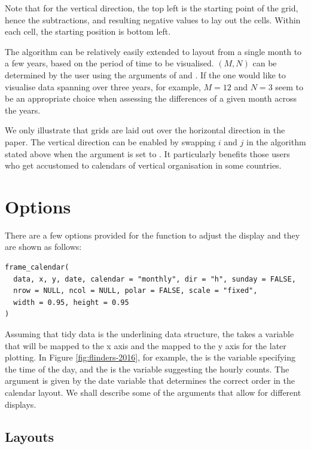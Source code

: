 \documentclass[article]{jss}
\begin{document}
Note that for the vertical direction, the top left is the starting point
of the grid, hence the subtractions, and resulting negative values to
lay out the cells. Within each cell, the starting position is bottom
left.

The algorithm can be relatively easily extended to layout from a single
month to a few years, based on the period of time to be visualised.
\((M, N)\) can be determined by the user using the arguments of
 and . If the one would like to visualise data
spanning over three years, for example, \(M = 12\) and \(N = 3\) seem to
be an appropriate choice when assessing the differences of a given month
across the years.

We only illustrate that grids are laid out over the horizontal direction
in the paper. The vertical direction can be enabled by swapping \(i\)
and \(j\) in the algorithm stated above when the argument  is
set to . It particularly benefits those users who get
accustomed to calendars of vertical organisation in some countries.

\section{Options}\label{options}

\label{sec:opt}

There are a few options provided for the  function
to adjust the display and they are shown as follows:

\begin{verbatim}
frame_calendar(
  data, x, y, date, calendar = "monthly", dir = "h", sunday = FALSE, 
  nrow = NULL, ncol = NULL, polar = FALSE, scale = "fixed",
  width = 0.95, height = 0.95
)
\end{verbatim}

Assuming that tidy data \citep{wickham2014tidy} is the underlining data
structure, the  takes a variable that will be mapped to the x
axis and the  mapped to the y axis for the later plotting. In
Figure \ref{fig:flinders-2016}, for example, the  is the
variable specifying the time of the day, and the  is the
variable suggesting the hourly counts. The  argument is given
by the date variable that determines the correct order in the calendar
layout. We shall describe some of the arguments that allow for different
displays.

\subsection{Layouts}\label{layouts}
\end{document}
